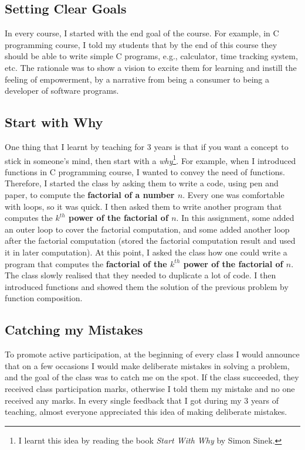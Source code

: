 \documentclass[a4paper]{article}
\begin{document}
\subsection{Setting Clear Goals}
In every course, I started with the end goal of the course. For example, 
in C programming course, I told my students that by the end of this 
course they should be 
able to write simple C programs, e.g., calculator, time tracking system, etc. 
The rationale was 
to show a vision to excite them 
for learning and instill the feeling of empowerment, by a narrative from
being a consumer to being a developer of software programs.



\subsection{Start with Why}
One thing that I learnt by teaching for 3 years is that if you want a concept 
to stick in someone's mind, then start with a \textit{why}\footnote{I learnt this idea by reading the book 
\textit{Start With Why} by Simon Sinek.}. For example, when I introduced functions 
in C programming course, I wanted to convey the need of functions. Therefore, I started the class by 
asking them to write a code, using pen and paper, to compute the \textbf{factorial of a number $n$}. 
Every one was comfortable with loops, so it was quick. I then asked them to write 
another program that computes the \textbf{$k^{th}$ power of the factorial of $n$}. 
In this assignment, some added an outer loop to cover the factorial computation, 
and some added another loop after the factorial computation (stored the factorial 
computation result and used it in later computation). 
At this point, I asked the class 
how one could write a program that computes the \textbf{factorial of 
the $k^{th}$ power of the factorial of $n$}. The class slowly realised 
that they needed to duplicate a lot of code. I then introduced functions 
and showed them the solution of the previous problem by function composition.


\subsection{Catching my Mistakes}
To promote active participation, at the beginning of every class I would announce that 
on a few occasions I would make deliberate mistakes in solving a problem, and the
goal of the class was to catch me on the spot.
If the class succeeded, they received  
class participation marks, otherwise I told them my 
mistake and no one received any marks. In every single 
feedback that I got during my 3 years of teaching, 
almost everyone appreciated this idea of making deliberate mistakes. 
\end{document}
